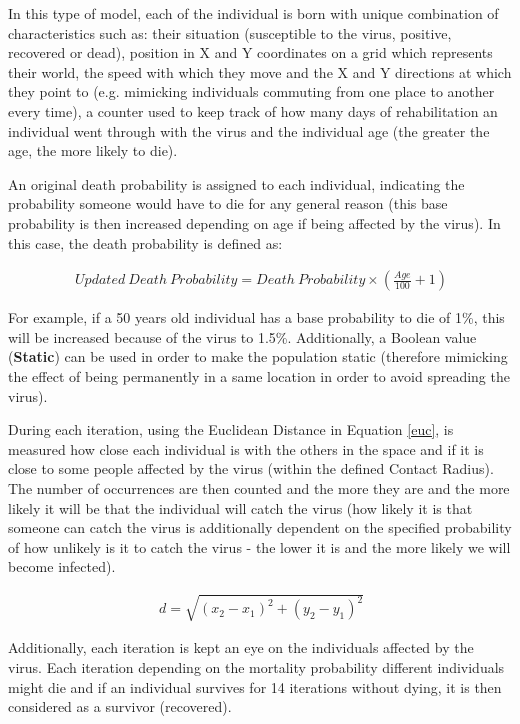 In this type of model, each of the individual is born with unique combination of characteristics such as: their situation (susceptible to the virus, positive, recovered or dead), position in X and Y coordinates on a grid which represents their world, the speed with which they move and the X and Y directions at which they point to (e.g. mimicking individuals commuting from one place to another every time), a counter used to keep track of how many days of rehabilitation an individual went through with the virus and the individual age (the greater the age, the more likely to die). 

An original death probability is assigned to each individual, indicating the probability someone would have to die for any general reason (this base probability is then increased depending on age if being affected by the virus). In this case, the death probability is defined as:

\useshortskip
\begin{align}
\ Updated\:Death\:Probability = Death\:Probability \times (\frac{Age}{100} + 1) 
\end{align}
\useshortskip

For example, if a 50 years old individual has a base probability to die of 1\%, this will be increased because of the virus to 1.5\%. Additionally, a Boolean value (\textbf{Static}) can be used in order to make the population static (therefore mimicking the effect of being permanently in a same location in order to avoid spreading the virus).

During each iteration, using the Euclidean Distance in Equation \ref{euc}, is measured how close each individual is with the others in the space and if it is close to some people affected by the virus (within the defined Contact Radius). The number of occurrences are then counted and the more they are and the more likely it will be that the individual will catch the virus (how likely it is that someone can catch the virus is additionally dependent on the specified probability of how unlikely is it to catch the virus - the lower it is and the more likely we will become infected).

\useshortskip
\begin{align}
\ d = \sqrt{(x_{2}-x_{1})^{2}+(y_{2}-y_{1})^{2}}
\label{euc}
\end{align}
\useshortskip

Additionally, each iteration is kept an eye on the individuals affected by the virus. Each iteration depending on the mortality probability different individuals might die and if an individual survives for 14 iterations without dying, it is then considered as a survivor (recovered).

